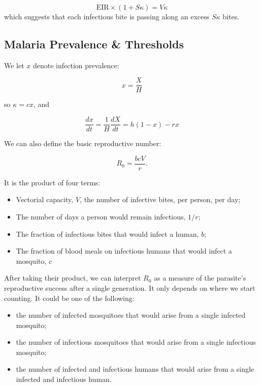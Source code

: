 \documentclass[
]{book}
\begin{document}
\[\mbox{EIR}\times (1 + S \kappa) = V \kappa\]
which suggests that each infectious bite is passing along an excess \(S\kappa\) bites.

\hypertarget{malaria-prevalence-thresholds}{%
\subsection{Malaria Prevalence \& Thresholds}\label{malaria-prevalence-thresholds}}

We let \(x\) denote infection prevalence:

\begin{equation}
x = \frac{X}{H} 
\end{equation}

so \(\kappa = c x\), and

\begin{equation}
\frac{dx}{dt} = \frac{1}{H} \frac{dX}{dt} = h (1-x)-r x
\end{equation}

We can also define the basic reproductive number:

\begin{equation}
R_0 = \frac{bcV}{r}.
\end{equation}

It is the product of four terms:

\begin{itemize}
\item
  Vectorial capacity, \(V\), the number of infective bites, per person, per day;
\item
  The number of days a person would remain infectious, \(1/r\);
\item
  The fraction of infectious bites that would infect a human, \(b\);
\item
  The fraction of blood meals on infectious humans that would infect a mosquito, \(c\)
\end{itemize}

After taking their product, we can interpret \(R_0\) as a measure of the parasite's reproductive success after a single generation. It only depends on where we start counting. It could be one of the following:

\begin{itemize}
\item
  the number of infected mosquitoes that would arise from a single infected mosquito;
\item
  the number of infectious mosquitoes that would arise from a single infectious mosquito;
\item
  the number of infected and infectious humans that would arise from a single infected and infectious human.
\end{itemize}
\end{document}
